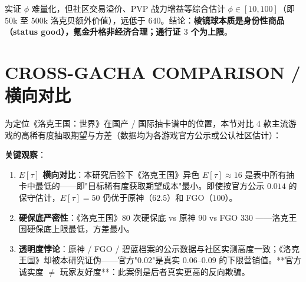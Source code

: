 \documentclass[journal]{IEEEtran}
\begin{document}
实证 $\phi$ 难量化，但社区交易溢价、PVP 战力增益等综合估计 $\phi \in [10, 100]$（即 $50$k 至 $500$k 洛克贝额外价值），远低于 $640$。结论：\textbf{棱镜球本质是身份性商品（status good），氪金升格非经济合理；通行证 $3$ 个为上限}。


\section{CROSS-GACHA COMPARISON / 横向对比}

为定位《洛克王国：世界》在国产 / 国际抽卡谱中的位置，本节对比 4 款主流游戏的高稀有度抽取期望与方差（数据均为各游戏官方公示或公认社区估计）：

\begin{table}[ht]
    \begin{center}
        \small
    \end{center}
    \caption{横向抽卡谱。$E[\tau]$ 为期望抽取数到目标。原神在 $k \ge 74$ 有显著软保底递增，故 $E[\tau] < 1/p_0$。FGO 新版加入累计 $330$ 抽天井。本研究后验下，《洛克王国》异色获取的期望成本仅 $\sim 16$ 次污染击破，远低于其他主流抽卡——位于"低 $E[\tau]$ + 严硬保底"区。}
    \label{tab:cross_gacha}
\end{table}

\textbf{关键观察}：

\begin{enumerate}
    \item \textbf{$E[\tau]$ 横向对比}：本研究后验下《洛克王国》异色 $E[\tau] \approx 16$ 是表中所有抽卡中最低的——即"目标稀有度获取期望成本"最小。即使按官方公示 $0.014$ 的保守估计，$E[\tau] = 50$ 仍优于原神（$62.5$）和 FGO（$100$）。
    \item \textbf{硬保底严密性}：《洛克王国》$80$ 次硬保底 vs 原神 $90$ vs FGO $330$ ——洛克王国硬保底上限最低，方差最小。
    \item \textbf{透明度悖论}：原神 / FGO / 碧蓝档案的公示数据与社区实测高度一致；《洛克王国》却被本研究证伪——官方"$0.02$"是真实 $0.06$--$0.09$ 的下限营销值。**官方诚实度 $\ne$ 玩家友好度**：此案例是后者真实更高的反向欺骗。
\end{enumerate}
\end{document}

